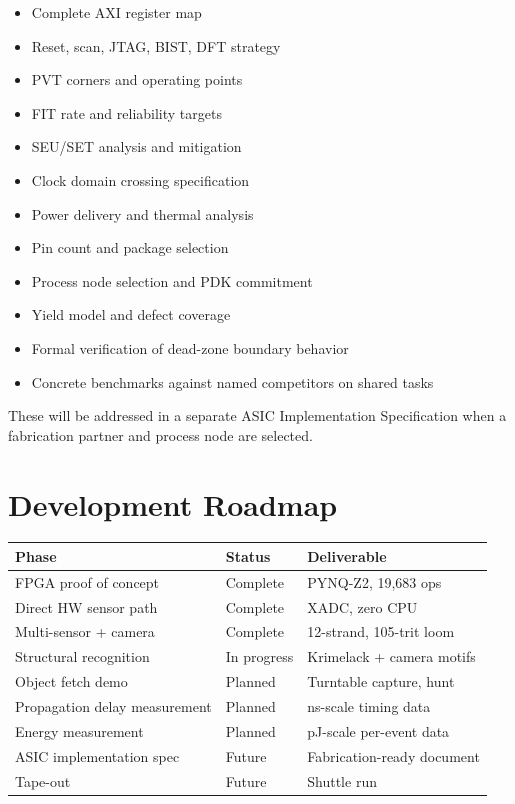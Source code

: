 \documentclass[11pt, a4paper]{article}
\begin{document}
\begin{itemize}[nosep]
  \item Complete AXI register map
  \item Reset, scan, JTAG, BIST, DFT strategy
  \item PVT corners and operating points
  \item FIT rate and reliability targets
  \item SEU/SET analysis and mitigation
  \item Clock domain crossing specification
  \item Power delivery and thermal analysis
  \item Pin count and package selection
  \item Process node selection and PDK commitment
  \item Yield model and defect coverage
  \item Formal verification of dead-zone boundary behavior
  \item Concrete benchmarks against named competitors on shared tasks
\end{itemize}

These will be addressed in a separate ASIC Implementation
Specification when a fabrication partner and process node are
selected.

\section{Development Roadmap}

\begin{center}
\begin{tabular}{@{}lll@{}}
\toprule
\textbf{Phase} & \textbf{Status} & \textbf{Deliverable} \\
\midrule
FPGA proof of concept & Complete & PYNQ-Z2, 19,683 ops \\
Direct HW sensor path & Complete & XADC, zero CPU \\
Multi-sensor + camera  & Complete & 12-strand, 105-trit loom \\
Structural recognition & In progress & Krimelack + camera motifs \\
Object fetch demo      & Planned & Turntable capture, hunt \\
Propagation delay measurement & Planned & ns-scale timing data \\
Energy measurement     & Planned & pJ-scale per-event data \\
ASIC implementation spec & Future & Fabrication-ready document \\
Tape-out               & Future & Shuttle run \\
\bottomrule
\end{tabular}
\end{center}
\end{document}
